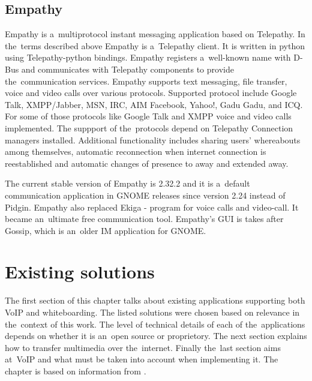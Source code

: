 
\section{Empathy}
Empathy is a~multiprotocol instant messaging application based on Telepathy. In the~terms described above Empathy is a~Telepathy client. It is written in python using Telepathy-python bindings. Empathy registers a~well-known name with D-Bus and communicates with Telepathy components to provide the~communication services. Empathy supports text messaging, file transfer, voice and video calls over various protocols. Supported protocol include Google Talk, XMPP/Jabber, MSN, IRC, AIM Facebook, Yahoo!, Gadu Gadu, and ICQ. For some of those protocols like Google Talk and XMPP voice and video calls implemented. The suppport of the~protocols depend on Telepathy Connection managers installed. Additional functionality includes sharing users' whereabouts among themselves, automatic reconnection when internet connection is reestablished and automatic changes of presence to away and extended away.\cite{empathyGnome}

The current stable version of Empathy is 2.32.2 and it is a~default communication application in GNOME releases since version 2.24 instead of Pidgin. Empathy also replaced Ekiga - program for voice calls and video-call. It became an~ultimate free communication tool. Empathy's GUI is takes after Gossip, which is an~older IM application for GNOME. 


\chapter{Existing solutions}\label{chapter:existing-solutions}
The first section of this chapter talks about existing applications supporting both VoIP and whiteboarding. The listed solutions were chosen based on relevance in the~context of this work. The level of technical details of each of the~applications depends on whether it is an~open source or proprietory. The next section explains how to transfer multimedia over the~internet. Finally the~last section aims at~VoIP and what must be taken into account when implementing it. The chapter is based on information from \cite{skypeProtocolAnalysis,voipPaper,digitalSpeechBook}.

